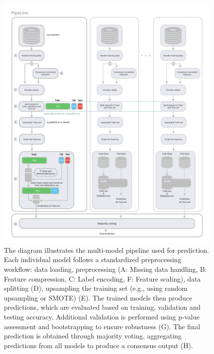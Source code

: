 \documentclass[12pt,a4paper]{report}
\begin{document}
\begin{figure}[H]
  \centering
  \hspace*{-0.9cm}
  \includegraphics[width=1.1\textwidth]{images/Pipeline-1.png}
  \caption[Consensus model pipeline diagram]{The diagram illustrates the multi-model pipeline used for prediction. Each individual model follows a standardized preprocessing workflow: data loading, preprocessing (A: Missing data handling, B: Feature compression, C: Label encoding, F: Feature scaling), data splitting (D), upsampling the training set (e.g., using random upsampling or SMOTE) (E). The trained models then produce predictions, which are evaluated based on training, validation and testing accuracy. Additional validation is performed using p-value assessment and bootstrapping to ensure robustness (G). The final prediction is obtained through majority voting, aggregating predictions from all models to produce a consensus output (H).}
  \label{fig:pipeline-1}
\end{figure}
\end{document}
